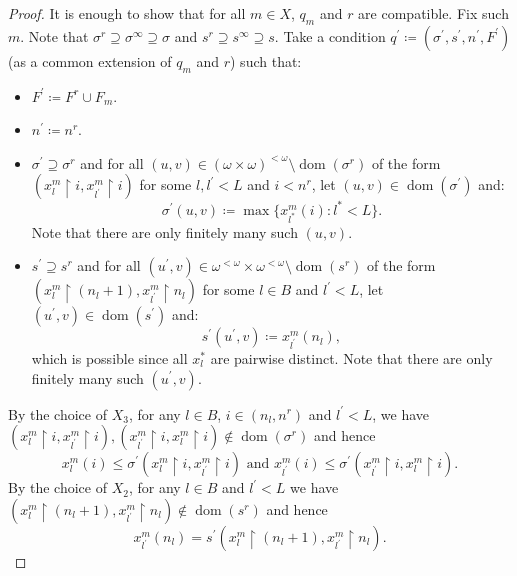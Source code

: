 \documentclass[a4paper,12pt]{amsart}
\theoremstyle{definition}
\numberwithin{thm}{section}
\numberwithin{equation}{section}
\newcommand{\fsq}{\omega^{<\omega}}
\newcommand{\on}{\mathpunct{\upharpoonright}}
\DeclareMathOperator{\dom}{dom}
\begin{document}
\begin{proof}
    	It is enough to show that for all $m\in X$, $q_m$ and $r$ are compatible.
    	Fix such $m$. Note that $\sigma^r\supseteq\sigma^\infty\supseteq\sigma$ and $s^r\supseteq s^\infty\supseteq s$.  
    	Take a condition $q^\prime\coloneq (\sigma^\prime,s^\prime,n^\prime,F^\prime)$ (as a common extension of $q_m$ and $r$) such that: 
    	\begin{itemize}
    		\item $F^\prime\coloneq F^r\cup F_m$.
    		\item $n^\prime\coloneqq n^r$.
    		\item $\sigma^\prime\supseteq\sigma^r$ and for all $(u,v)\in(\omega\times\omega)^{<\omega}\setminus \dom (\sigma^r)$ of the form $(x^{m}_{l}\on i, x^{m}_{l^\prime}\on i)$ for some $l,l^\prime<L$ and $i<n^r$, let $(u,v)\in\dom(\sigma^\prime)$ and:
            \begin{equation}
                \sigma^\prime(u,v)\coloneqq \max\{x^{m}_{l^*}(i):l^*<L\}. 
            \end{equation}
            Note that there are only finitely many such $(u,v)$.
    		\item $s^\prime\supseteq s^r$ and for all $(u^\prime,v)\in\fsq\times\fsq\setminus \dom (s^r)$ of the form $(x^{m}_{l}\on (n_l+1), x^{m}_{l^\prime}\on n_l)$ for some $l\in B$ and $l^\prime<L$, 
            let $(u^\prime,v)\in\dom(s^\prime)$ and:
            \begin{equation}
            \label{equation:s_prime_ED}
                s^\prime(u^\prime,v)\coloneqq x^{m}_{l^\prime}(n_l),
            \end{equation}
            which is possible since all $x^*_l$ are pairwise distinct. Note that there are only finitely many such $(u^\prime,v)$.
    	\end{itemize}
    	By the choice of $X_3$, for any $l\in B$, $i\in\left(n_l,n^r\right)$ and $l^\prime<L$, we have 
    	$(x^m_l\on i, x^m_{l^\prime}\on i), (x^m_{l^\prime}\on i, x^m_l\on i)\notin \dom (\sigma^r)$ and hence
    	\begin{equation}
    		\label{eq:sigma_prime}
    		x^m_l(i)\leq\sigma^\prime(x^m_l\on i, x^m_{l^\prime}\on i)\text{ and }x^m_{l^\prime}(i)\leq\sigma^\prime(x^m_{l^\prime}\on i, x^m_l\on i).
    	\end{equation}
    	By the choice of $X_2$, for any $l\in B$ and $l^\prime<L$ we have $(x^m_l\on(n_l+1),x^m_{l^\prime}\on n_l)\notin\dom(s^r)$ and hence 
    	\begin{equation}
    		\label{eq:s_prime}
    		x^m_{l^\prime}(n_l)= s^\prime(x^m_l\on(n_l+1),x^m_{l^\prime}\on n_l).
    	\end{equation}
    	

\end{proof}
\end{document}
